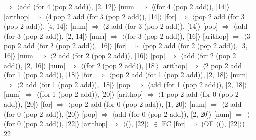 \documentclass[12pt]{report}
\begin{document}
$\Rightarrow$ $\langle$add (for 4 (pop 2 add)), [2, 12]$\rangle$ \hfill [num] \newline
$\Rightarrow$ $\langle$(for 4 (pop 2 add)), [14]$\rangle$ \hfill [arithop] \newline
$\Rightarrow$ $\langle$4 pop 2 add (for 3 (pop 2 add)), [14]$\rangle$ \hfill [for] \newline
$\Rightarrow$ $\langle$pop 2 add (for 3 (pop 2 add)), [4, 14]$\rangle$ \hfill [num] \newline
$\Rightarrow$ $\langle$2 add (for 3 (pop 2 add)), [14]$\rangle$ \hfill [pop] \newline
$\Rightarrow$ $\langle$add (for 3 (pop 2 add)), [2, 14]$\rangle$ \hfill [num] \newline
$\Rightarrow$ $\langle$(for 3 (pop 2 add)), [16]$\rangle$ \hfill [arithop] \newline
$\Rightarrow$ $\langle$3 pop 2 add (for 2 (pop 2 add)), [16]$\rangle$ \hfill [for] \newline
$\Rightarrow$ $\langle$pop 2 add (for 2 (pop 2 add)), [3, 16]$\rangle$ \hfill [num] \newline
$\Rightarrow$ $\langle$2 add (for 2 (pop 2 add)), [16]$\rangle$ \hfill [pop] \newline
$\Rightarrow$ $\langle$add (for 2 (pop 2 add)), [2, 16]$\rangle$ \hfill [num] \newline
$\Rightarrow$ $\langle$(for 2 (pop 2 add)), [18]$\rangle$ \hfill [arithop] \newline
$\Rightarrow$ $\langle$2 pop 2 add (for 1 (pop 2 add)), [18]$\rangle$ \hfill [for] \newline
$\Rightarrow$ $\langle$pop 2 add (for 1 (pop 2 add)), [2, 18]$\rangle$ \hfill [num] \newline
$\Rightarrow$ $\langle$2 add (for 1 (pop 2 add)), [18]$\rangle$ \hfill [pop] \newline
$\Rightarrow$ $\langle$add (for 1 (pop 2 add)), [2, 18]$\rangle$ \hfill [num] \newline
$\Rightarrow$ $\langle$(for 1 (pop 2 add)), [20]$\rangle$ \hfill [arithop] \newline
$\Rightarrow$ $\langle$1 pop 2 add (for 0 (pop 2 add)), [20]$\rangle$ \hfill [for] \newline
$\Rightarrow$ $\langle$pop 2 add (for 0 (pop 2 add)), [1, 20]$\rangle$ \hfill [num] \newline
$\Rightarrow$ $\langle$2 add (for 0 (pop 2 add)), [20]$\rangle$ \hfill [pop] \newline
$\Rightarrow$ $\langle$add (for 0 (pop 2 add)), [2, 20]$\rangle$ \hfill [num] \newline
$\Rightarrow$ $\langle$(for 0 (pop 2 add)), [22]$\rangle$ \hfill [arithop] \newline
$\Rightarrow$ $\langle$(), [22]$\rangle$ $\in$ FC \hfill [for] \newline
$\Rightarrow$ (OF $\langle$(), [22]$\rangle$) = 22
\end{document}
